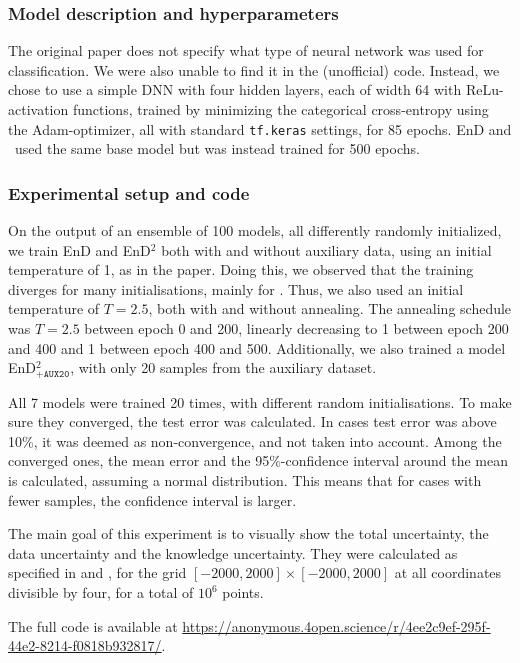  

\subsubsection{Model description and hyperparameters}
The original paper does not specify what type of neural network was used for classification. We were also unable to find it in the (unofficial) code. Instead, we chose to use a simple DNN with four hidden layers, each of width 64 with ReLu-activation functions, trained by minimizing the categorical cross-entropy using the Adam-optimizer, all with standard \texttt{tf.keras} settings, for 85 epochs. EnD and \EnDD \ used the same base model but was instead trained for 500 epochs. 


\subsubsection{Experimental setup and code}

On the output of an ensemble of 100 models, all differently randomly initialized, we train EnD and EnD$^2$ both with and without auxiliary data, using an initial temperature of 1, as in the paper. Doing this, we observed that the training diverges for many initialisations, mainly for \EnDDaux. Thus, we also used an initial temperature of $T = 2.5$, both with and without annealing. The annealing schedule was $T = 2.5$ between epoch 0 and 200, linearly decreasing to 1 between epoch 200 and 400 and 1 between epoch 400 and 500. Additionally, we also trained a model EnD$^2_{\texttt{+AUX20}}$, with only 20 samples from the auxiliary dataset. 

All 7 models were trained 20 times, with different random initialisations. To make sure they converged, the test error was calculated. In cases test error was above 10\%, it was deemed as non-convergence, and not taken into account. Among the converged ones, the mean error and the 95\%-confidence interval around the mean is calculated, assuming a normal distribution. This means that for cases with fewer samples, the confidence interval is larger.  

The main goal of this experiment is to visually show the total uncertainty, the data uncertainty and the knowledge uncertainty. They were calculated as specified in \cite{malinin2019ensemble} and \cite{NIPS2018_7936}, for the grid $[-2000, 2000] \times [-2000, 2000]$ at all coordinates divisible by four, for a total of $10^6$ points. 

The full code is available at \href{https://anonymous.4open.science/r/4ee2c9ef-295f-44e2-8214-f0818b932817/}{https://anonymous.4open.science/r/4ee2c9ef-295f-44e2-8214-f0818b932817/}.


